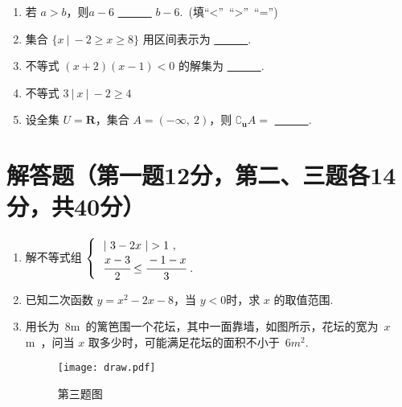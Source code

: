 \documentclass{ctexart}
\begin{document}
    \begin{enumerate}%
        \item 若 $a>b$，则$a-6$ \underline{~~~~~~} $b-6$.~(填“<”~“>”~“=”)
        
        \item 集合 $\{ x~|~-2\ge x\ge8 \}$ 用区间表示为 \underline{~~~~~~}.
        
        \item 不等式 $(x+2)(x-1) < 0$ 的解集为 \underline{~~~~~~}.

        \item 不等式 $3~|~x~|~ -2 \ge 4$

        \item 设全集 $U = \mathbb{\textbf{R}} $，集合 $A = (-\infty,~2)$，则 $\complement_\textbf{u}A =$ \underline{~~~~~~}.

    \end{enumerate}

\section{解答题（第一题12分，第二、三题各14分，共40分）}

	\begin{enumerate}%

\item 解不等式组 $\begin{cases}~~|~3-2x~|>1~,\\ ~~\cfrac{x-3}{2} \le \cfrac{-1-x}{3}~.\end{cases}$
  
\vspace{1.5cm}
\newpage

\item  已知二次函数 $y = x^2 - 2x -8$，当 $y < 0$时，求 $x$ 的取值范围.

\vspace{3cm}

\item 用长为~8m~的篱笆围一个花坛，其中一面靠墙，如图所示，花坛的宽为~$x$m~，问当 $x$ 取多少时，可能满足花坛的面积不小于~$6m^2$.

\begin{figure}[h]
     \flushright
     \texttt{[image: draw.pdf]}
     \captionsetup{justification=raggedleft,singlelinecheck=false}
     \caption{\small{第三题图}}
\end{figure}

\end{enumerate}
\end{document}
